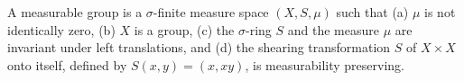 A measurable group is a $\sigma$-finite measure space $(X,S,\mu)$ such that (a) $\mu$ is not identically zero, (b) $X$ is a group, (c) the $\sigma$-ring $S$ and the measure $\mu$ are invariant under left translations, and (d) the shearing transformation $S$ of $X \times X$ onto itself, defined by $S(x,y) = (x,xy)$, is measurability preserving.
